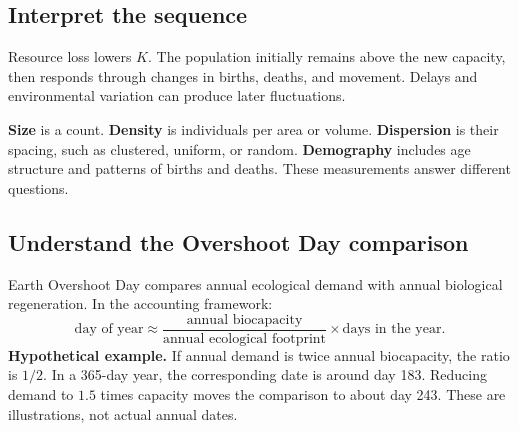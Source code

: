 \subsection*{Interpret the sequence}
Resource loss lowers $K$. The population initially remains above the new capacity, then responds through changes in births, deaths, and movement. Delays and environmental variation can produce later fluctuations.
\begin{center}
\par
\end{center}
\textbf{Size} is a count. \textbf{Density} is individuals per area or volume. \textbf{Dispersion} is their spacing, such as clustered, uniform, or random. \textbf{Demography} includes age structure and patterns of births and deaths. These measurements answer different questions.

\subsection*{Understand the Overshoot Day comparison}
Earth Overshoot Day compares annual ecological demand with annual biological regeneration. In the accounting framework:
\[
\text{day of year}\approx
\frac{\text{annual biocapacity}}{\text{annual ecological footprint}}
\times\text{days in the year}.
\]
\textbf{Hypothetical example.} If annual demand is twice annual biocapacity, the ratio is $1/2$. In a 365-day year, the corresponding date is around day 183. Reducing demand to $1.5$ times capacity moves the comparison to about day 243. These are illustrations, not actual annual dates.
